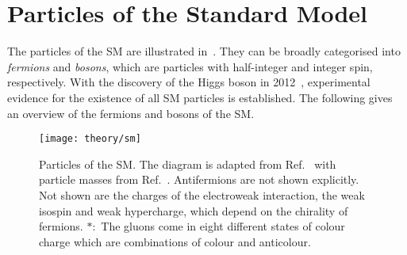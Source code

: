 \section{Particles of the Standard Model}%
\label{sec:sm_overview}

The particles of the SM are illustrated in~. They can be
broadly categorised into \emph{fermions} and \emph{bosons}, which are particles
with half-integer and integer spin, respectively. With the discovery of the
Higgs boson in 2012~\cite{HIGG-2012-27,CMS-HIG-12-028}, experimental evidence
for the existence of all SM particles is established. The following gives an
overview of the fermions and bosons of the SM.


\begin{figure}[htbp]
  \centering

  \texttt{[image: theory/sm]}

  \caption[Particles of the SM.]{Particles of the SM. The diagram is adapted
    from Ref.~\cite{sm_tikz} with particle masses from
    Ref.~\cite{pdg2020}. Antifermions are not shown explicitly.  Not shown are
    the charges of the electroweak interaction, the weak isospin and weak
    hypercharge, which depend on the chirality of fermions. $*$:~The gluons come
    in eight different states of colour charge which are combinations of colour
    and anticolour.}%
  \label{fig:sm_particles}
\end{figure}

